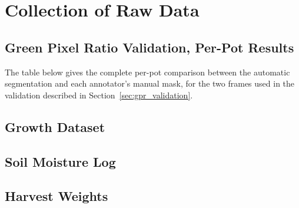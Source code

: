 \chapter{Collection of Raw Data}
\label{app:rawdata}

%
%

\section{Green Pixel Ratio Validation, Per-Pot Results}

The table below gives the complete per-pot comparison between the automatic
segmentation and each annotator's manual mask, for the two frames used in the
validation described in Section~\ref{sec:gpr_validation}.


\section{Growth Dataset}


\section{Soil Moisture Log}


\section{Harvest Weights}

